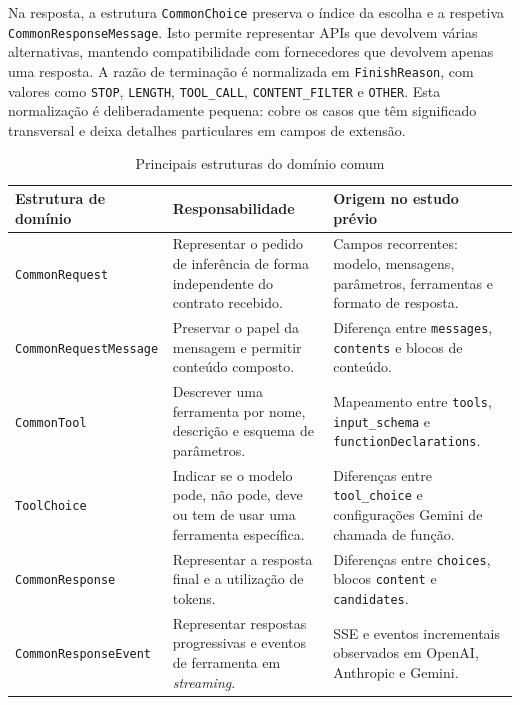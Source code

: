 \documentclass[11pt,a4paper]{report}
\begin{document}
    Na resposta, a estrutura \texttt{CommonChoice} preserva o índice da escolha e a respetiva \texttt{CommonResponseMessage}. Isto permite representar APIs que devolvem várias alternativas, mantendo compatibilidade com fornecedores que devolvem apenas uma resposta. A razão de terminação é normalizada em \texttt{FinishReason}, com valores como \texttt{STOP}, \texttt{LENGTH}, \texttt{TOOL\_CALL}, \texttt{CONTENT\_FILTER} e \texttt{OTHER}. Esta normalização é deliberadamente pequena: cobre os casos que têm significado transversal e deixa detalhes particulares em campos de extensão.

    \begin{table}[H]
        \centering
        \scriptsize
        \renewcommand{\arraystretch}{1.25}
        \begin{tabularx}{\textwidth}{|>{\raggedright\arraybackslash}p{3.8cm}|Y|Y|}
            \hline
            \textbf{Estrutura de domínio} & \textbf{Responsabilidade} & \textbf{Origem no estudo prévio} \\
            \hline
            \texttt{CommonRequest} & Representar o pedido de inferência de forma independente do contrato recebido. & Campos recorrentes: modelo, mensagens, parâmetros, ferramentas e formato de resposta. \\
            \hline
            \texttt{CommonRequestMessage} & Preservar o papel da mensagem e permitir conteúdo composto. & Diferença entre \texttt{messages}, \texttt{contents} e blocos de conteúdo. \\
            \hline
            \texttt{CommonTool} & Descrever uma ferramenta por nome, descrição e esquema de parâmetros. & Mapeamento entre \texttt{tools}, \texttt{input\_schema} e \texttt{functionDeclarations}. \\
            \hline
            \texttt{ToolChoice} & Indicar se o modelo pode, não pode, deve ou tem de usar uma ferramenta específica. & Diferenças entre \texttt{tool\_choice} e configurações Gemini de chamada de função. \\
            \hline
            \texttt{CommonResponse} & Representar a resposta final e a utilização de tokens. & Diferenças entre \texttt{choices}, blocos \texttt{content} e \texttt{candidates}. \\
            \hline
            \texttt{CommonResponseEvent} & Representar respostas progressivas e eventos de ferramenta em \textit{streaming}. & SSE e eventos incrementais observados em OpenAI, Anthropic e Gemini. \\
            \hline
        \end{tabularx}
        \caption{Principais estruturas do domínio comum}
        \label{tab:domain-structures}
    \end{table}
\end{document}
